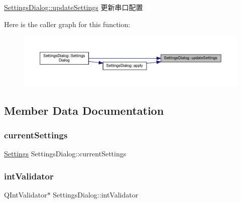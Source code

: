 \mbox{\hyperlink{class_settings_dialog_a349c9a5d2af7bb8001df096b43786d2d}{Settings\+Dialog\+::update\+Settings}} 更新串口配置 

Here is the caller graph for this function\+:
\nopagebreak
\begin{figure}[H]
\begin{center}
\leavevmode
\includegraphics[width=350pt]{class_settings_dialog_a349c9a5d2af7bb8001df096b43786d2d_icgraph}
\end{center}
\end{figure}


\subsection{Member Data Documentation}
\mbox{\label{class_settings_dialog_a9500689af503b7213b98d576ef8fa1e1}} 
\subsubsection{\texorpdfstring{currentSettings}{currentSettings}}
{\footnotesize\ttfamily \mbox{\hyperlink{struct_settings_dialog_1_1_settings}{Settings}} Settings\+Dialog\+::current\+Settings\hspace{0.3cm}{\ttfamily [private]}}

\mbox{\label{class_settings_dialog_a925d4c1575508422a40fddb01c3eb1f4}} 
\subsubsection{\texorpdfstring{intValidator}{intValidator}}
{\footnotesize\ttfamily Q\+Int\+Validator$\ast$ Settings\+Dialog\+::int\+Validator\hspace{0.3cm}{\ttfamily [private]}}

\mbox{\label{class_settings_dialog_aef76017ec1056d6e88e6bb48cdf73b0f}} 
